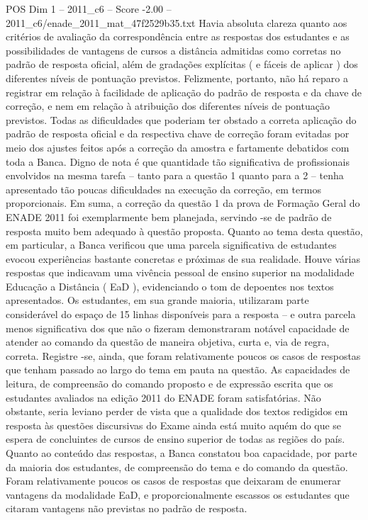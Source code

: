 \begin{textsample}{POS Dim 1 – 2011\_c6 – Score -2.00 – 2011\_c6/enade\_2011\_mat\_47f2529b35.txt}
Havia absoluta clareza quanto aos critérios de avaliação da correspondência entre as respostas dos estudantes e as possibilidades de vantagens de cursos a distância admitidas como corretas no padrão de resposta oficial, além de gradações explícitas ( e fáceis de aplicar ) dos diferentes níveis de pontuação previstos.
Felizmente, portanto, não há reparo a registrar em relação à facilidade de aplicação do padrão de resposta e da chave de correção, e nem em relação à atribuição dos diferentes níveis de pontuação previstos.
Todas as dificuldades que poderiam ter obstado a correta aplicação do padrão de resposta oficial e da respectiva chave de correção foram evitadas por meio dos ajustes feitos após a correção da amostra e fartamente debatidos com toda a Banca.
Digno de nota é que quantidade tão significativa de profissionais envolvidos na mesma tarefa – tanto para a questão 1 quanto para a 2 – tenha apresentado tão poucas dificuldades na execução da correção, em termos proporcionais.
Em suma, a correção da questão 1 da prova de Formação Geral do ENADE 2011 foi exemplarmente bem planejada, servindo -se de padrão de resposta muito bem adequado à questão proposta.
Quanto ao tema desta questão, em particular, a Banca verificou que uma parcela significativa de estudantes evocou experiências bastante concretas e próximas de sua realidade.
Houve várias respostas que indicavam uma vivência pessoal de ensino superior na modalidade Educação a Distância ( EaD ), evidenciando o tom de depoentes nos textos apresentados.
Os estudantes, em sua grande maioria, utilizaram parte considerável do espaço de 15 linhas disponíveis para a resposta – e outra parcela menos significativa dos que não o fizeram demonstraram notável capacidade de atender ao comando da questão de maneira objetiva, curta e, via de regra, correta.
Registre -se, ainda, que foram relativamente poucos os casos de respostas que tenham passado ao largo do tema em pauta na questão.
As capacidades de leitura, de compreensão do comando proposto e de expressão escrita que os estudantes avaliados na edição 2011 do ENADE foram satisfatórias.
Não obstante, seria leviano perder de vista que a qualidade dos textos redigidos em resposta às questões discursivas do Exame ainda está muito aquém do que se espera de concluintes de cursos de ensino superior de todas as regiões do país.
Quanto ao conteúdo das respostas, a Banca constatou boa capacidade, por parte da maioria dos estudantes, de compreensão do tema e do comando da questão.
Foram relativamente poucos os casos de respostas que deixaram de enumerar vantagens da modalidade EaD, e proporcionalmente escassos os estudantes que citaram vantagens não previstas no padrão de resposta.

\end{textsample}
